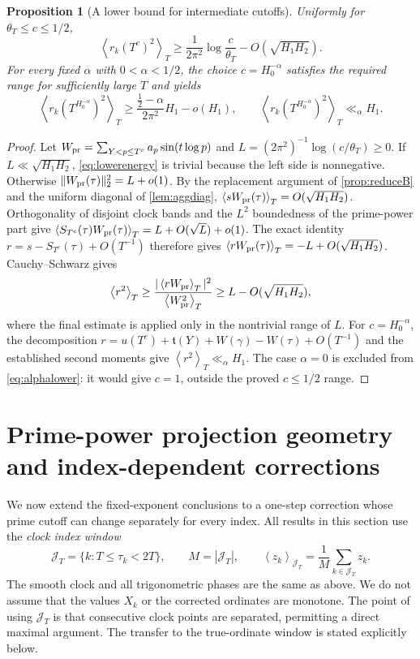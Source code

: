 \documentclass[11pt,reqno]{amsart}
\numberwithin{equation}{section}
\newtheorem{proposition}[theorem]{Proposition}
\newcommand{\av}[1]{\left\langle #1\right\rangle_T}
\newcommand{\avgJ}[1]{\left\langle #1\right\rangle_{\mathcal J_T}}
\begin{document}
\begin{proposition}[A lower bound for intermediate cutoffs]
\label{prop:intermediate}
Uniformly for $\theta_T\le c\le1/2$,
\begin{equation}\label{eq:lowerenergy}
\av{r_k(T^c)^2}
\ge\frac1{2\pi^2}\log\frac c{\theta_T}
 -O(\sqrt{H_1H_2}).
\end{equation}
For every fixed $\alpha$ with $0<\alpha<1/2$, the choice
$c=H_0^{-\alpha}$ satisfies the required range for sufficiently
large $T$ and yields
\begin{equation}\label{eq:alphalower}
\av{r_k(T^{H_0^{-\alpha}})^2}
\ge\frac{\frac12-\alpha}{2\pi^2}H_1-o(H_1),
\qquad\av{r_k(T^{H_0^{-\alpha}})^2}\ll_\alpha H_1.
\end{equation}
\end{proposition}
\begin{proof}
Let $W_{\rm pr}=\sum_{Y<p\le T^c}a_p\sin(t\log p)$
and $L=(2\pi^2)^{-1}\log(c/\theta_T)\ge0$.
If $L\ll\sqrt{H_1H_2}$, \eqref{eq:lowerenergy} is trivial
because the left side is nonnegative.  Otherwise
$\|W_{\rm pr}(\tau)\|_2^2=L+o(1)$.
By the replacement argument of \cref{prop:reduceB} and the
uniform diagonal of \cref{lem:aggdiag},
$\av{sW_{\rm pr}(\tau)}=O(\sqrt{H_1H_2})$.
Orthogonality of disjoint clock bands and the $L^2$ boundedness
of the prime-power part give
$\av{S_{T^c}(\tau)W_{\rm pr}(\tau)}
 =L+O(\sqrt L)+o(1)$.
The exact identity $r=s-S_{T^c}(\tau)+O(T^{-1})$ therefore gives
$\av{rW_{\rm pr}(\tau)}=-L+O(\sqrt{H_1H_2})$.
Cauchy--Schwarz gives
\[
\av{r^2}\ge
\frac{|\av{rW_{\rm pr}}|^2}{\av{W_{\rm pr}^2}}
\ge L-O(\sqrt{H_1H_2}),
\]
where the final estimate is applied only in the nontrivial range
of $L$.  For $c=H_0^{-\alpha}$, the decomposition
$r=u(T^c)+\mathfrak t(Y)+W(\gamma)-W(\tau)+O(T^{-1})$
and the established second moments give $\av{r^2}\ll_\alpha H_1$.
The case $\alpha=0$ is excluded from \eqref{eq:alphalower}:
it would give $c=1$, outside the proved $c\le1/2$ range.
\end{proof}



\section{Prime-power projection geometry and index-dependent corrections}
\label{sec:variableprojection}
We now extend the fixed-exponent conclusions to a one-step correction whose prime cutoff can change separately for every index. All results in this section use the \emph{clock index window}
\begin{equation}\label{eq:projwindow}
\mathcal J_T=\{k:T\le\tau_k<2T\},\qquad M=|\mathcal J_T|,\qquad
\avgJ{z_k}=\frac1M\sum_{k\in\mathcal J_T}z_k.
\end{equation}
The smooth clock and all trigonometric phases are the same as above. We do not assume that the values $X_k$ or the corrected ordinates are monotone. The point of using $\mathcal J_T$ is that consecutive clock points are separated, permitting a direct maximal argument. The transfer to the true-ordinate window is stated explicitly below.
\end{document}
